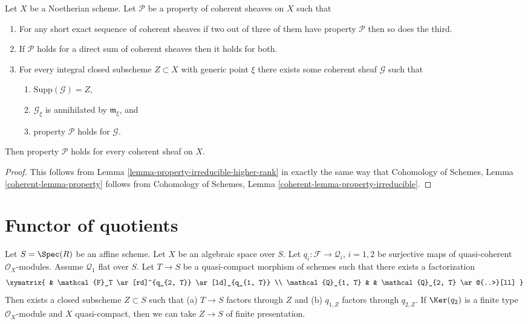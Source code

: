 \begin{lemma}
\label{lemma-property-higher-rank}
Let $X$ be a Noetherian scheme.
Let $\mathcal{P}$ be a property of coherent sheaves on $X$ such that
\begin{enumerate}
\item For any short exact sequence of coherent sheaves if two
out of three of them have property $\mathcal{P}$ then so does the
third.
\item If $\mathcal{P}$ holds for a direct sum of coherent sheaves
then it holds for both.
\item For every integral closed subscheme $Z \subset X$
with generic point $\xi$ there exists
some coherent sheaf $\mathcal{G}$ such that
\begin{enumerate}
\item $\text{Supp}(\mathcal{G}) = Z$,
\item $\mathcal{G}_\xi$ is annihilated by $\mathfrak m_\xi$, and
\item property $\mathcal{P}$ holds for $\mathcal{G}$.
\end{enumerate}
\end{enumerate}
Then property $\mathcal{P}$ holds for every coherent sheaf
on $X$.
\end{lemma}

\begin{proof}
This follows from Lemma \ref{lemma-property-irreducible-higher-rank}
in exactly the same way that
Cohomology of Schemes, Lemma \ref{coherent-lemma-property} follows from
Cohomology of Schemes, Lemma \ref{coherent-lemma-property-irreducible}.
\end{proof}






\section{Functor of quotients}
\label{section-quotients}

\begin{lemma}
\label{lemma-factors-through-quotient}
Let $S = \Spec(R)$ be an affine scheme. Let $X$ be an algebraic space over
$S$. Let $q_i : \mathcal{F} \to \mathcal{Q}_i$, $i = 1, 2$
be surjective maps of quasi-coherent $\mathcal{O}_X$-modules.
Assume $\mathcal{Q}_1$ flat over $S$. Let $T \to S$ be a quasi-compact
morphism of schemes such that there exists a factorization
$$
\xymatrix{
& \mathcal{F}_T \ar[rd]^{q_{2, T}} \ar[ld]_{q_{1, T}} \\
\mathcal{Q}_{1, T} & & \mathcal{Q}_{2, T} \ar@{..>}[ll]
}
$$
Then exists a closed subscheme $Z \subset S$ such that
(a) $T \to S$ factors through $Z$ and (b)
$q_{1, Z}$ factors through $q_{2, Z}$.
If $\Ker(q_2)$ is a finite type $\mathcal{O}_X$-module and $X$
quasi-compact, then we can take $Z \to S$ of finite presentation.
\end{lemma}


